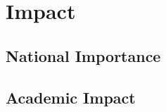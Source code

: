 \section{Impact}
\label{sec:proposed_approach}


\subsection*{National Importance}
\label{sec:national_importance}


\subsection*{Academic Impact}
\label{sec:academic_impact}


\let\oldbibliography\thebibliography
\renewcommand{\thebibliography}[1]{\oldbibliography{#1}
\setlength{\itemsep}{-3pt}}


{
\scriptsize

}

